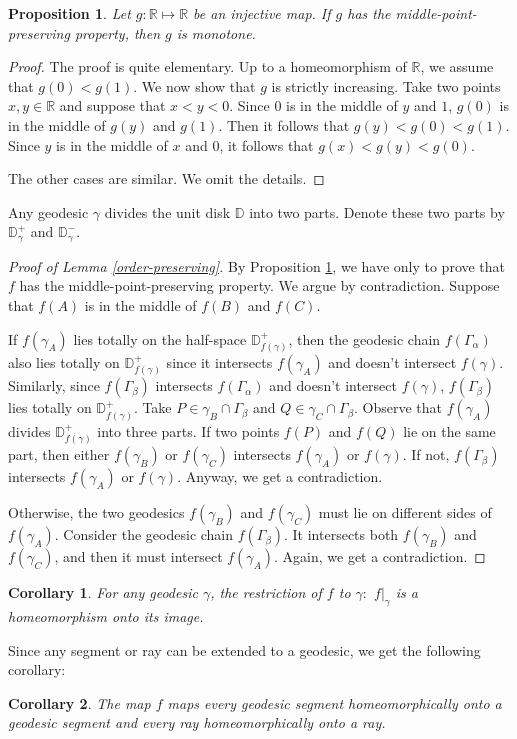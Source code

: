 \documentclass{amsart}
\theoremstyle{plain}
\newtheorem{Proposition}{Proposition}[section]
\newtheorem{Corollary}{Corollary}[section]
\theoremstyle{definition}
\theoremstyle{remark}
\begin{document}
% 
% 
\begin{Proposition} \label{middle-point-property}
    Let $g:\mathbb{R} \mapsto \mathbb{R}$ be an injective map.  If $g$ has the middle-point-preserving property, then $g$ is monotone.  
\end{Proposition}
\begin{proof}
    The proof is quite elementary.  Up to a homeomorphism of $\mathbb{R}$, we assume that $g(0)<g(1)$.  We now show that $g$ is strictly increasing.  Take two points $x, y \in \mathbb{R}$ and suppose that $x<y<0$.  Since $0$ is in the middle of $y$ and $1$, $g(0)$ is in the middle of $g(y)$ and $g(1)$.  Then it follows that $g(y) < g(0) < g(1)$. Since $y$ is in the middle of $x$ and $0$, it follows that $g(x) < g(y) < g(0)$. \par
    The other cases are similar.  We omit the  details.  
\end{proof}
% 
Any geodesic $\gamma$ divides the unit disk $\mathbb{D}$ into two parts.  Denote these two parts by $\mathbb{D}_\gamma^+$ and $\mathbb{D}_\gamma^-$.
\begin{proof}[Proof of Lemma \ref{order-preserving}]
    By Proposition \ref{middle-point-property}, we have only to prove that $f$ has the middle-point-preserving property.  We argue by contradiction.  Suppose that $f(A)$ is in the middle of $f(B)$ and $f(C)$. \par  %
    If $f(\gamma_A)$ lies totally on the half-space $\mathbb{D}^+_{f(\gamma)}$, then the geodesic chain $f(\Gamma_\alpha)$ also lies totally on $\mathbb{D}^+_{f(\gamma)}$ since it intersects $f(\gamma_A)$ and doesn't intersect $f(\gamma)$.  Similarly, since $f(\Gamma_\beta)$ intersects $f(\Gamma_\alpha)$ and doesn't intersect $f(\gamma)$, $f(\Gamma_\beta)$ lies totally on $\mathbb{D}^+_{f(\gamma)}$.  Take $P\in \gamma_B \cap \Gamma_\beta$ and $Q \in \gamma_C \cap \Gamma_\beta$.  Observe that $f(\gamma_A)$ divides $\mathbb{D}^+_{f(\gamma)}$ into three parts.  If two points $f(P)$ and $f(Q)$ lie on the same part, then either $f(\gamma_B)$ or $f(\gamma_C)$ intersects $f(\gamma_A)$ or $f(\gamma)$. If not, $f(\Gamma_\beta)$ intersects $f(\gamma_A)$ or $f(\gamma)$.  Anyway, we get a contradiction. \par 
    Otherwise, the two geodesics  $f(\gamma_B)$ and $f(\gamma_C)$ must lie on different sides of $f(\gamma_A)$.  Consider the geodesic chain $f(\Gamma_\beta)$.  It intersects both $f(\gamma_B)$ and $f(\gamma_C)$, and then it must intersect $f(\gamma_A)$.  Again, we get a contradiction.  
\end{proof}
% 
\begin{Corollary}
    For any geodesic $\gamma$, the restriction of $f$ to $\gamma:$ $f|_\gamma$ is a homeomorphism onto its image.  
\end{Corollary}
Since any segment or ray can be extended to a geodesic, we get the following corollary:
\begin{Corollary}
    The map $f$ maps every geodesic segment homeomorphically onto a geodesic segment and every ray homeomorphically onto a ray.  
\end{Corollary}
% 
\end{document}
